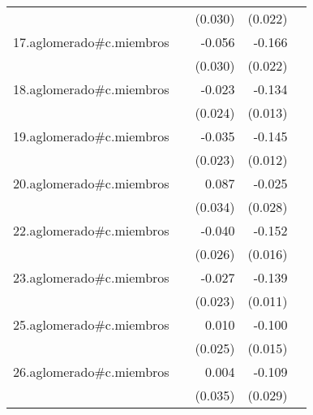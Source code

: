 {\begin{longtable}{l*{4}{D{.}{.}{-1}}}
            &                     &     (0.030)         &     (0.022)         &                     \\
\addlinespace
17.aglomerado#c.miembros&                     &      -0.056         &      -0.166\sym{***}&                     \\
            &                     &     (0.030)         &     (0.022)         &                     \\
\addlinespace
18.aglomerado#c.miembros&                     &      -0.023         &      -0.134\sym{***}&                     \\
            &                     &     (0.024)         &     (0.013)         &                     \\
\addlinespace
19.aglomerado#c.miembros&                     &      -0.035         &      -0.145\sym{***}&                     \\
            &                     &     (0.023)         &     (0.012)         &                     \\
\addlinespace
20.aglomerado#c.miembros&                     &       0.087\sym{*}  &      -0.025         &                     \\
            &                     &     (0.034)         &     (0.028)         &                     \\
\addlinespace
22.aglomerado#c.miembros&                     &      -0.040         &      -0.152\sym{***}&                     \\
            &                     &     (0.026)         &     (0.016)         &                     \\
\addlinespace
23.aglomerado#c.miembros&                     &      -0.027         &      -0.139\sym{***}&                     \\
            &                     &     (0.023)         &     (0.011)         &                     \\
\addlinespace
25.aglomerado#c.miembros&                     &       0.010         &      -0.100\sym{***}&                     \\
            &                     &     (0.025)         &     (0.015)         &                     \\
\addlinespace
26.aglomerado#c.miembros&                     &       0.004         &      -0.109\sym{***}&                     \\
            &                     &     (0.035)         &     (0.029)         &                     \\

\end{longtable}}
